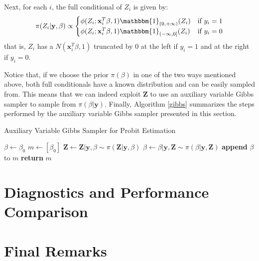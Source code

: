 \documentclass{article}
\newcommand{\IF}[2]{\mathbbm{1}_{#1}(#2)} %
\renewcommand{\vec}[1]{\mathbf{#1}}
\begin{document}
\par
Next, for each \(i\), the full conditional of \(Z_i\) is given by:
\begin{equation*}
    \pi(Z_i | \vec{y}, \beta) \propto 
    \begin{cases}
        \phi(Z_i; \vec{x}_i^T \beta, 1) \IF{(0, +\infty)}{Z_i} & \text{if } y_i = 1 \\
        \phi(Z_i; \vec{x}_i^T \beta, 1) \IF{(-\infty, 0]}{Z_i} & \text{if } y_i = 0
    \end{cases}
\end{equation*}
that is, \(Z_i\) has a \(N(\vec{x}_i^T \beta, 1)\) truncated by 0 at the left if \(y_i = 1\) and at the right if \(y_i = 0\).
\par 
Notice that, if we choose the prior \(\pi(\beta)\) in one of the two ways mentioned above, both full conditionals have a known distribution and can be easily sampled from. This means that we can indeed exploit \(\vec{Z}\) to use an auxiliary variable Gibbs sampler to sample from \(\pi(\beta|\vec{y})\). Finally, Algorithm \ref{gibbs} summarizes the steps performed by the auxiliary variable Gibbs sampler presented in this section.

\begin{algorithm}
\caption{Auxiliary Variable Gibbs Sampler for Probit Estimation}\label{gibbs}
\begin{algorithmic}[1]
    \State $\beta \gets \beta_0$
    \State $m \gets [\beta_0]$
    \Repeat
        \State $\vec{Z} \gets \vec{Z} | \vec{y}, \beta \sim \pi(\vec{Z}|\vec{y}, \beta)$
        \State $\beta \gets \beta | \vec{y}, \vec{Z} \sim \pi(\beta | \vec{y}, \vec{Z})$
        \State \textbf{append} $\beta$ to $m$
    \State \textbf{return} $m$
\EndProcedure
\end{algorithmic}
\end{algorithm}

\section{Diagnostics and Performance Comparison}
\section{Final Remarks}
\end{document}
